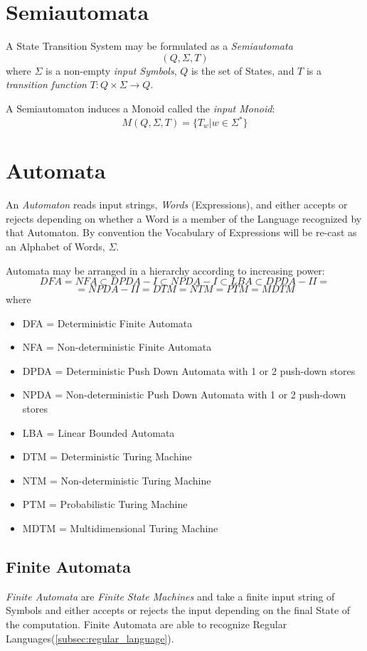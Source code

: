\documentclass{article}
\begin{document}
\section{Semiautomata}
A State Transition System may be formulated as a \emph{Semiautomata}
\[
    (Q,\Sigma,T)
\]
where $\Sigma$ is a non-empty \emph{input Symbols}, $Q$ is the set of
States, and $T$ is a \emph{transition function} $T:Q \times \Sigma
\rightarrow Q$.

A Semiautomaton induces a Monoid called the \emph{input Monoid}:
\[
    M(Q,\Sigma,T) = \{T_w | w \in \Sigma^*\}
\]

\section{Automata}
\label{subsec:automata}

An \emph{Automaton} reads input strings, \emph{Words} (Expressions),
and either accepts or rejects depending on whether a Word is a member
of the Language recognized by that Automaton. By convention the
Vocabulary of Expressions will be re-cast as an Alphabet of Words,
$\Sigma$.

Automata may be arranged in a hierarchy according to increasing power:
\[
    DFA = NFA \subset DPDA-I \subset NPDA-I \subset LBA \subset DPDA-II =
\]\[
    = NPDA-II = DTM = NTM = PTM = MDTM
\]
where
\begin{itemize}
\item DFA = Deterministic Finite Automata
\item NFA = Non-deterministic Finite Automata
\item DPDA = Deterministic Push Down Automata with 1
  or 2 push-down stores
\item NPDA = Non-deterministic Push Down Automata
  with 1 or 2 push-down stores
\item LBA = Linear Bounded Automata
\item DTM = Deterministic Turing Machine
\item NTM = Non-deterministic Turing Machine
\item PTM = Probabilistic Turing Machine
\item MDTM = Multidimensional Turing Machine
\end{itemize}

\subsection{Finite Automata}
\emph{Finite Automata} are \emph{Finite State Machines} and take a
finite input string of Symbols and either accepts or rejects the
input depending on the final State of the computation. Finite
Automata are able to recognize Regular Languages(\ref{subsec:regular_language}).
\end{document}
